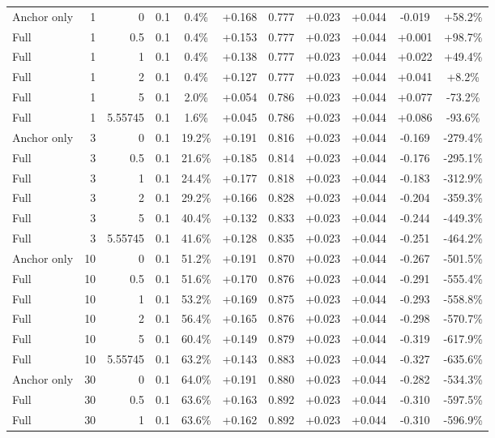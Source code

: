 \begin{table}[htbp]
\begin{tabular}{lrrrccccccc}
Anchor only & 1 & 0 & 0.1 & 0.4\% & +0.168 & 0.777 & +0.023 & +0.044 & -0.019 & +58.2\% \\
Full & 1 & 0.5 & 0.1 & 0.4\% & +0.153 & 0.777 & +0.023 & +0.044 & +0.001 & +98.7\% \\
Full & 1 & 1 & 0.1 & 0.4\% & +0.138 & 0.777 & +0.023 & +0.044 & +0.022 & +49.4\% \\
Full & 1 & 2 & 0.1 & 0.4\% & +0.127 & 0.777 & +0.023 & +0.044 & +0.041 & +8.2\% \\
Full & 1 & 5 & 0.1 & 2.0\% & +0.054 & 0.786 & +0.023 & +0.044 & +0.077 & -73.2\% \\
Full & 1 & 5.55745 & 0.1 & 1.6\% & +0.045 & 0.786 & +0.023 & +0.044 & +0.086 & -93.6\% \\
Anchor only & 3 & 0 & 0.1 & 19.2\% & +0.191 & 0.816 & +0.023 & +0.044 & -0.169 & -279.4\% \\
Full & 3 & 0.5 & 0.1 & 21.6\% & +0.185 & 0.814 & +0.023 & +0.044 & -0.176 & -295.1\% \\
Full & 3 & 1 & 0.1 & 24.4\% & +0.177 & 0.818 & +0.023 & +0.044 & -0.183 & -312.9\% \\
Full & 3 & 2 & 0.1 & 29.2\% & +0.166 & 0.828 & +0.023 & +0.044 & -0.204 & -359.3\% \\
Full & 3 & 5 & 0.1 & 40.4\% & +0.132 & 0.833 & +0.023 & +0.044 & -0.244 & -449.3\% \\
Full & 3 & 5.55745 & 0.1 & 41.6\% & +0.128 & 0.835 & +0.023 & +0.044 & -0.251 & -464.2\% \\
Anchor only & 10 & 0 & 0.1 & 51.2\% & +0.191 & 0.870 & +0.023 & +0.044 & -0.267 & -501.5\% \\
Full & 10 & 0.5 & 0.1 & 51.6\% & +0.170 & 0.876 & +0.023 & +0.044 & -0.291 & -555.4\% \\
Full & 10 & 1 & 0.1 & 53.2\% & +0.169 & 0.875 & +0.023 & +0.044 & -0.293 & -558.8\% \\
Full & 10 & 2 & 0.1 & 56.4\% & +0.165 & 0.876 & +0.023 & +0.044 & -0.298 & -570.7\% \\
Full & 10 & 5 & 0.1 & 60.4\% & +0.149 & 0.879 & +0.023 & +0.044 & -0.319 & -617.9\% \\
Full & 10 & 5.55745 & 0.1 & 63.2\% & +0.143 & 0.883 & +0.023 & +0.044 & -0.327 & -635.6\% \\
Anchor only & 30 & 0 & 0.1 & 64.0\% & +0.191 & 0.880 & +0.023 & +0.044 & -0.282 & -534.3\% \\
Full & 30 & 0.5 & 0.1 & 63.6\% & +0.163 & 0.892 & +0.023 & +0.044 & -0.310 & -597.5\% \\
Full & 30 & 1 & 0.1 & 63.6\% & +0.162 & 0.892 & +0.023 & +0.044 & -0.310 & -596.9\% \\

\end{tabular}
\end{table}
